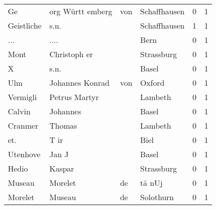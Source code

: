 \begin{tabular}{llllrr}
                       Ge &                  org  Württ emberg &         von &                                Schaffhausen &          0 &         1 \\
               Geistliche &                               s.n. &             &                                Schaffhausen &          1 &         1 \\
                      ... &                               .... &             &                                        Bern &          0 &         1 \\
                     Mont &                       Christoph er &             &                                  Strassburg &          0 &         1 \\
                        X &                               s.n. &             &                                       Basel &          0 &         1 \\
                      Ulm &                    Johannes Konrad &         von &                                      Oxford &          0 &         1 \\
                 Vermigli &                      Petrus Martyr &             &                                     Lambeth &          0 &         1 \\
                   Calvin &                           Johannes &             &                                       Basel &          0 &         1 \\
                  Cranmer &                             Thomas &             &                                     Lambeth &          0 &         1 \\
                      et. &                               T ir &             &                                        Biel &          0 &         1 \\
                 Utenhove &                              Jan J &             &                                       Basel &          0 &         1 \\
                    Hedio &                             Kaspar &             &                                  Strassburg &          0 &         1 \\
                   Museau &                            Morelet &          de &                                      tä nUj &          0 &         1 \\
                  Morelet &                             Museau &          de &                                   Solothurn &          0 &         1 \\

\end{tabular}
